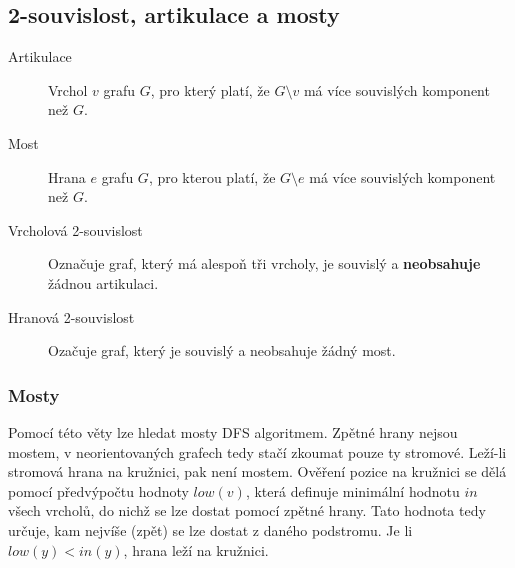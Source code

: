 \subsection{2-souvislost, artikulace a mosty}

\begin{description}
    \item[Artikulace] Vrchol $v$ grafu $G$, pro který platí, že $G \setminus v$ má více souvislých komponent než $G$.
    \item[Most] Hrana $e$ grafu $G$, pro kterou platí, že $G \setminus e$ má více souvislých komponent než $G$.
    \item[Vrcholová 2-souvislost] Označuje graf, který má alespoň tři vrcholy, je souvislý a \textbf{neobsahuje} žádnou artikulaci.
    \item[Hranová 2-souvislost] Ozačuje graf, který je souvislý a neobsahuje žádný most.
\end{description}

\subsubsection{Mosty}


Pomocí této věty lze hledat mosty DFS algoritmem.
Zpětné hrany nejsou mostem, v neorientovaných grafech tedy stačí zkoumat pouze ty stromové.
Leží-li stromová hrana na kružnici, pak není mostem.
Ověření pozice na kružnici se dělá pomocí předvýpočtu hodnoty $low(v)$, která definuje minimální hodnotu $in$ všech vrcholů, do nichž se lze dostat pomocí zpětné hrany.
Tato hodnota tedy určuje, kam nejvíše (zpět) se lze dostat z daného podstromu.
Je li $low(y) < in(y)$, hrana leží na kružnici.
